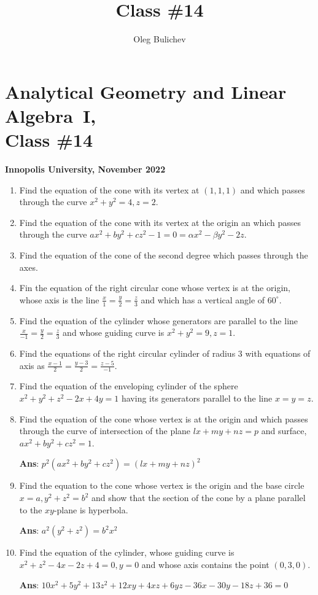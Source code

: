 \documentclass[a4paper,10pt]{article}
\title{Class \#14}
\author{Oleg Bulichev}
\date{}
\begin{document}
\section*{Analytical Geometry and Linear Algebra~I, \\ Class \#14}
\noindent\textbf{Innopolis University, November 2022}
\\

\begin{enumerate}

  \item Find the equation of the cone with its vertex at $(1,1,1)$ and which passes through the curve $x^2+y^2=4, z =2$.

  \item Find the equation of the cone with its vertex at the origin an which passes through the curve $ax^2+by^2+cz^2-1=0= \alpha x^2 - \beta y^2 - 2z$.
  
  \item Find the equation of the cone of the second degree which passes through the axes.
  
  \item Fin the equation of the right circular cone whose vertex is at the origin, whose axis is the line $\frac{x}{1}=\frac{y}{2}=\frac{z}{3}$ and which has a vertical angle of $60^\circ$.
  
  \item Find the equation of the cylinder whose generators are parallel to the line $\frac{x}{-1}=\frac{y}{2}=\frac{z}{3}$ and whose guiding curve is $x^2+y^2=9, z=1$.
  
  \item Find the equations of the right circular cylinder of radius $3$ with equations of axis as  $\frac{x-1}{2}=\frac{y-3}{2}=\frac{z-5}{-1}$.
  
  \item Find the equation of the enveloping cylinder of the sphere $x^2+y^2+z^2-2x+4y=1$ having its generators parallel to the line $x=y=z$.
  
  \item   Find the equation of the cone whose vertex is at the origin and which passes through the curve of intersection of the plane $lx+my+nz=p$ and surface, $ax^2+by^2+cz^2=1$.

\textbf{Ans}: $p^2(ax^2+by^2+cz^2)=(lx+my+nz)^2$

\item Find the equation to the cone whose vertex is the origin and the base circle $x=a, y^2+z^2=b^2$ and show that the section of the cone by a plane parallel to the $xy$-plane is hyperbola.

\textbf{Ans}: $a^2(y^2+z^2)=b^2x^2$

\item  Find the equation of the cylinder, whose guiding curve is $x^2+z^2-4x-2z+4=0, y =0$ and whose axis contains the point $(0,3,0)$. 

\textbf{Ans}: $10x^2+5y^2+13z^2+12xy+4xz+6yz-36x-30y-18z+36=0$ 

\end{enumerate}
\end{document}
